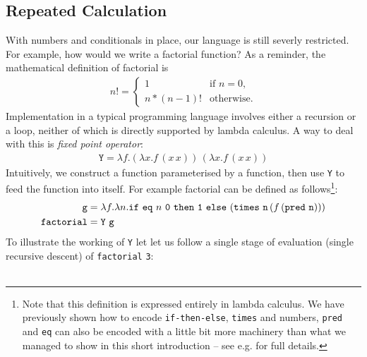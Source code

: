 \documentclass[11pt,twoside,a4paper]{article} %
\newcommand{\mkw}[1]{{\bf \mathtt{#1}}}
\newcommand{\sym}[1]{\texttt{#1}}
\newcommand{\msym}[1]{\mathtt{#1}}
\begin{document}
\subsection{Repeated Calculation}

With numbers and conditionals in place, our language is still severly
restricted. For example, how would we write a factorial function? As a
reminder, the mathematical definition of factorial is
\begin{align*}
n!=\begin{cases}
    1 & \text{if $n=0$},\\
    n*(n-1)! & \text{otherwise}.
  \end{cases}
\end{align*}
Implementation in a typical programming language involves either a recursion or
a loop, neither of which is directly supported by lambda calculus. A way to
deal with this is \emph{fixed point operator}:
\begin{align*}
\msym{Y}=\lambda f.(\lambda x.f\,(x\,x))\,(\lambda x.f\,(x\,x))
\end{align*}
Intuitively, we construct a function parameterised by a function, then use
\sym{Y} to feed the function into itself. For example factorial
can be defined as follows\footnote{Note that this definition is expressed 
entirely in lambda calculus. We have
previously shown how to encode \sym{if-then-else}, \sym{times} and numbers,
\sym{pred} and \sym{eq} can also be encoded with a little bit more machinery
than what we managed to show in this short introduction -- see e.g. \cite{TAPL} for 
full details.}:
\begin{align*}
\msym{g} &= \lambda f.\lambda
n.\mkw{if}\ \msym{eq}\ n\ \msym{0}\ \mkw{then}\ \msym{1}\ \mkw{else}\ (\msym{times}\ \msym{n}\,(f\,(\msym{pred}\ \msym{n}))) \\
\msym{factorial} &= \msym{Y}\ \msym{g}
\end{align*}
To illustrate the working of \sym{Y} let let us follow a single stage of evaluation
(single recursive descent) of \sym{factorial} \sym{3}:
\\\\
\end{document}
